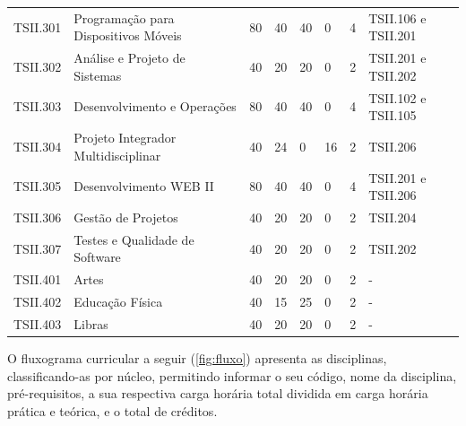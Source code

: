 \documentclass[
	12pt,				%
	openright,			%
	twoside,			%
	a4paper,			%
	chapter=TITLE,		%
	english,			%
	french,				%
	spanish,			%
	brazil,				%
	]{abntex2}
\begin{document}
\begin{quadro}[h]
{\begin{tabular}{p{1.2cm}p{4.2cm} p{1cm} p{1.2cm} p{1.3cm} p{.8cm} p{1cm} p{1.6cm}}
\rowcolor[HTML]{EFEFEF} 
TSII.301 & Programação para  \newline Dispositivos Móveis    & 80 & 40 & 40 & 0  & 4 & TSII.106 e TSII.201 \\
TSII.302 & Análise e Projeto de Sistemas           & 40 & 20 & 20 & 0  & 2 & TSII.201 e TSII.202 \\
\rowcolor[HTML]{EFEFEF} 
TSII.303 & Desenvolvimento e  \newline Operações             & 80 & 40 & 40 & 0  & 4 & TSII.102 e TSII.105 \\
TSII.304 & Projeto Integrador  \newline Multidisciplinar     & 40 & 24 & 0  & 16 & 2 & TSII.206            \\
\rowcolor[HTML]{EFEFEF} 
TSII.305 & Desenvolvimento WEB II                  & 80 & 40 & 40 & 0  & 4 & TSII.201 e TSII.206 \\
TSII.306 & Gestão de Projetos                      & 40 & 20 & 20 & 0  & 2 & TSII.204            \\
\rowcolor[HTML]{EFEFEF} 
TSII.307 & Testes e Qualidade  \newline de Software          & 40 & 20 & 20 & 0  & 2 & TSII.202            \\ \midrule

TSII.401 & Artes          & 40 & 20 & 20 & 0  & 2 & -          \\ 
TSII.402 & Educação Física          & 40 & 15 & 25 & 0  & 2 & -            \\  
TSII.403 & Libras          & 40 & 20 & 20 & 0  & 2 & -            \\  \hline

\end{tabular}

}{
}
\end{quadro}
O fluxograma curricular a seguir (\autoref{fig:fluxo}) apresenta as disciplinas, classificando-as por núcleo, permitindo informar o seu código, nome da disciplina, pré-requisitos, a sua respectiva carga horária total dividida em carga horária prática e teórica, e o total de créditos. %

\clearpage
\newpage

\end{document}
